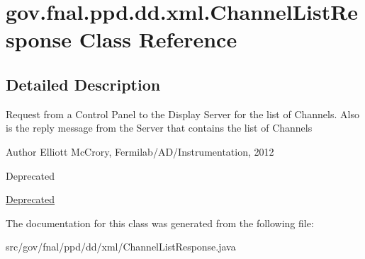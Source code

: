 \hypertarget{classgov_1_1fnal_1_1ppd_1_1dd_1_1xml_1_1ChannelListResponse}{\section{gov.\-fnal.\-ppd.\-dd.\-xml.\-Channel\-List\-Response Class Reference}
\label{classgov_1_1fnal_1_1ppd_1_1dd_1_1xml_1_1ChannelListResponse}
}


\subsection{Detailed Description}
Request from a Control Panel to the Display Server for the list of Channels. Also is the reply message from the Server that contains the list of Channels

\begin{DoxyAuthor}{Author}
Elliott Mc\-Crory, Fermilab/\-A\-D/\-Instrumentation, 2012 
\end{DoxyAuthor}
\begin{DoxyRefDesc}{Deprecated}
\item[\hyperlink{deprecated__deprecated000022}{Deprecated}]\end{DoxyRefDesc}


The documentation for this class was generated from the following file\-:\begin{DoxyCompactItemize}
\item 
src/gov/fnal/ppd/dd/xml/Channel\-List\-Response.\-java\end{DoxyCompactItemize}
